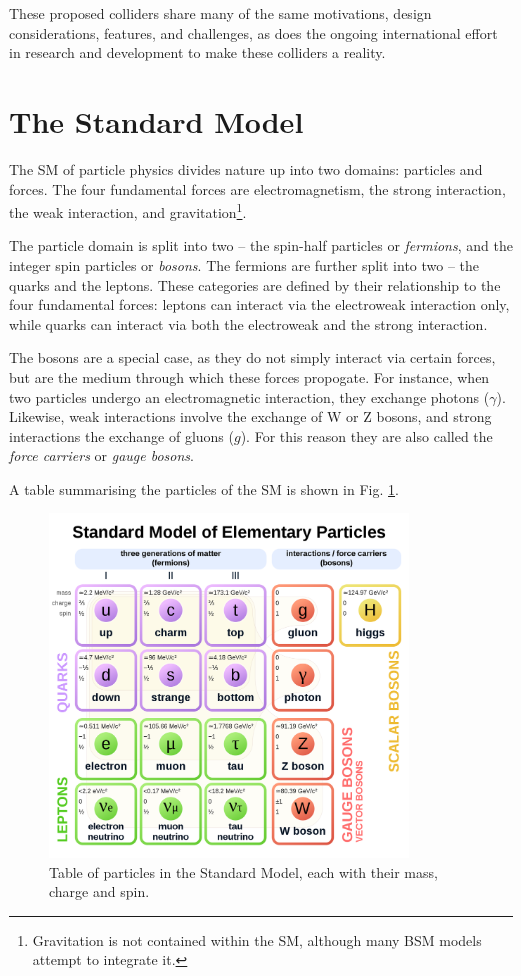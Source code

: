 These proposed colliders share many of the same motivations, design considerations, features, and challenges, as does the ongoing international effort in research and development to make these colliders a reality.

\section{The Standard Model}
The \acrlong{SM} of particle physics divides nature up into two domains: particles and forces. The four fundamental forces are electromagnetism, the strong interaction, the weak interaction, and gravitation\footnote{Gravitation is not contained within the \acrshort{SM}, although many \acrshort{BSM} models attempt to integrate it.}.

The particle domain is split into two -- the spin-half particles or \textit{fermions}, and the integer spin particles or \textit{bosons}. The fermions are further split into two -- the quarks and the leptons. These categories are defined by their relationship to the four fundamental forces: leptons can interact via the electroweak interaction only, while quarks can interact via both the electroweak and the strong interaction.

The bosons are a special case, as they do not simply interact via certain forces, but are the medium through which these forces propogate. For instance, when two particles undergo an electromagnetic interaction, they exchange photons ($\gamma$). Likewise, weak interactions involve the exchange of W or Z bosons, and strong interactions the exchange of gluons ($g$). For this reason they are also called the \textit{force carriers} or \textit{gauge bosons}.

A table summarising the particles of the \acrlong{SM} is shown in Fig. \ref{figure:colliders/SM}.

\begin{figure}[h]
	\centering
	\includegraphics[width=0.85\textwidth]{../Pictures/StandardModel.png}
	\caption{Table of particles in the Standard Model, each with their mass, charge and spin.}
	\label{figure:colliders/SM}
\end{figure}

